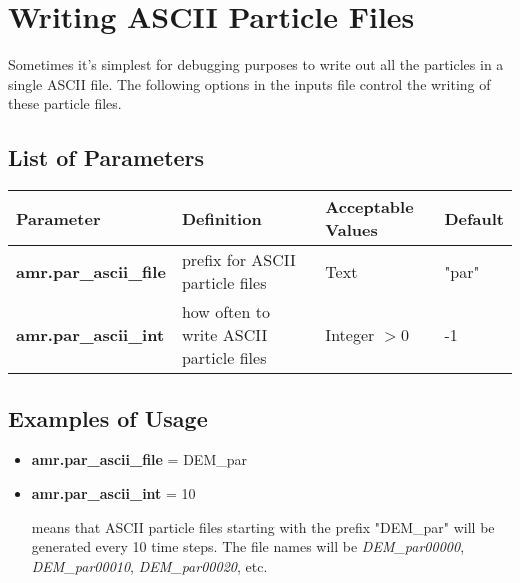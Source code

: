 \section{Writing ASCII Particle Files}
\label{sec:AsciiFiles}
Sometimes it's simplest for debugging purposes to write out all the particles in a single ASCII file.
The following options in the inputs file control the writing of these particle files.

\subsection{List of Parameters}

\begin{table*}[h]
\begin{scriptsize}
\begin{center}
\begin{tabular}{|l|l|l|l|} \hline
Parameter & Definition & Acceptable Values &Default\\
\hline
{\bf amr.par\_ascii\_file} & prefix for ASCII particle files & Text & "par" \\
{\bf amr.par\_ascii\_int}  & how often to write ASCII particle files & Integer $> 0$ & -1  \\
\hline
\end{tabular}
\end{center}
\end{scriptsize}
\end{table*}

\subsection{Examples of Usage}

\begin{itemize}

\item {\bf amr.par\_ascii\_file} = DEM\_par
\item {\bf amr.par\_ascii\_int} = 10

means that ASCII particle files starting with the prefix "DEM\_par" will be
generated every 10 time steps.  The file names will be 
{\it DEM\_par00000}, {\it DEM\_par00010}, {\it DEM\_par00020}, etc.  

\end{itemize}


